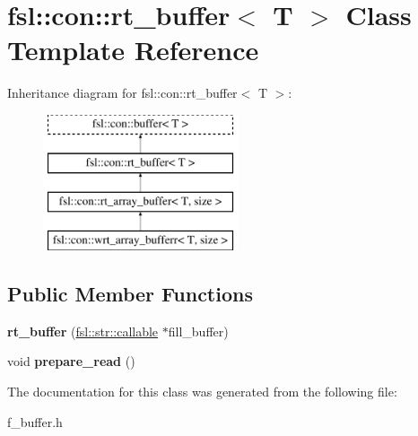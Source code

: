 \hypertarget{classfsl_1_1con_1_1rt__buffer}{}\section{fsl\+::con\+::rt\+\_\+buffer$<$ T $>$ Class Template Reference}
\label{classfsl_1_1con_1_1rt__buffer}
Inheritance diagram for fsl\+::con\+::rt\+\_\+buffer$<$ T $>$\+:\begin{figure}[H]
\begin{center}
\leavevmode
\includegraphics[height=4.000000cm]{classfsl_1_1con_1_1rt__buffer}
\end{center}
\end{figure}
\subsection*{Public Member Functions}
\begin{DoxyCompactItemize}
\item 
\mbox{\label{classfsl_1_1con_1_1rt__buffer_a0b224312fcd69919946791a33f0e3282}} 
{\bfseries rt\+\_\+buffer} (\mbox{\hyperlink{classfsl_1_1str_1_1callable}{fsl\+::str\+::callable}} $\ast$fill\+\_\+buffer)
\item 
\mbox{\label{classfsl_1_1con_1_1rt__buffer_a0aa8a81f8e4fee9e2c76d9de163e9119}} 
void {\bfseries prepare\+\_\+read} ()
\end{DoxyCompactItemize}


The documentation for this class was generated from the following file\+:\begin{DoxyCompactItemize}
\item 
f\+\_\+buffer.\+h\end{DoxyCompactItemize}
